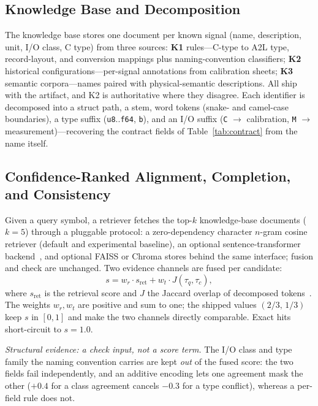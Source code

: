 \documentclass[conference]{IEEEtran}
\begin{document}
\subsection{Knowledge Base and Decomposition}
\label{sec:kb}
The knowledge base stores one document per known signal (name, description,
unit, I/O class, C type) from three sources: \textbf{K1} rules---C-type to
A2L type, record-layout, and conversion mappings plus naming-convention
classifiers; \textbf{K2} historical configurations---per-signal annotations
from calibration sheets; \textbf{K3} semantic corpora---names paired with
physical-semantic descriptions. All ship with the artifact, and K2 is
authoritative where they disagree. Each identifier is decomposed into a
struct path, a stem, word tokens (snake- and camel-case boundaries), a type
suffix (\texttt{u8}..\texttt{f64}, \texttt{b}), and an I/O suffix
(\texttt{C} $\rightarrow$ calibration, \texttt{M} $\rightarrow$
measurement)---recovering the contract fields of Table~\ref{tab:contract}
from the name itself.

\subsection{Confidence-Ranked Alignment, Completion, and Consistency}
\label{sec:align}
Given a query symbol, a retriever fetches the top-$k$ knowledge-base
documents ($k{=}5$) through a pluggable protocol: a zero-dependency character
$n$-gram cosine retriever (default and experimental baseline), an optional
sentence-transformer backend~\cite{reimers2019sbert}, and optional FAISS or
Chroma stores behind the same interface; fusion and check are unchanged.
Two evidence channels are fused per candidate:
\begin{equation}
s = w_r \cdot s_{\mathrm{ret}} + w_t \cdot J(\tau_q, \tau_c),
\label{eq:fusion}
\end{equation}
where $s_{\mathrm{ret}}$ is the retrieval score and $J$ the Jaccard overlap of
decomposed tokens~\cite{jaccard1901}. The weights $w_r, w_t$ are positive and
sum to one; the shipped values $(2/3,\,1/3)$ keep $s$ in $[0,1]$ and make the
two channels directly comparable. Exact hits short-circuit to $s{=}1.0$.

\emph{Structural evidence: a check input, not a score term.} The I/O class
and type family the naming convention carries are kept \emph{out} of the
fused score: the two fields fail independently, and an additive encoding lets
one agreement mask the other ($+0.4$ for a class agreement cancels $-0.3$ for
a type conflict), whereas a per-field rule does not.
\end{document}
